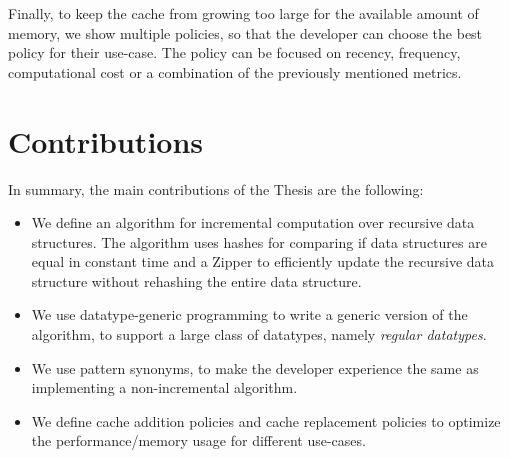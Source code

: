 

Finally, to keep the cache from growing too large for the available amount of memory, we show multiple policies, so that the developer can choose the best policy for their use-case. The policy can be focused on recency, frequency, computational cost or a combination of the previously mentioned metrics.

\newpage
\section{Contributions}

In summary, the main contributions of the Thesis are the following:

\begin{itemize}
    \item We define an algorithm for incremental computation over recursive data structures. The algorithm uses hashes for comparing if data structures are equal in constant time and a Zipper to efficiently update the recursive data structure without rehashing the entire data structure.
    \item We use datatype-generic programming to write a generic version of the algorithm, to support a large class of datatypes, namely \textit{regular datatypes}.
    \item We use pattern synonyms, to make the developer experience the same as implementing a non-incremental algorithm.
    \item We define cache addition policies and cache replacement policies to optimize the performance/memory usage for different use-cases.
\end{itemize}


